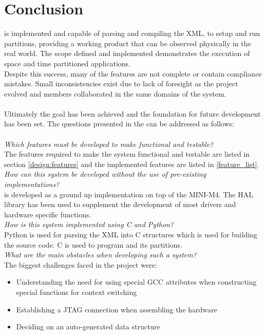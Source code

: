 \chapter{Conclusion}
\OSname{} is implemented and capable of parsing and
compiling the XML, to setup and run partitions, providing
a working product that can be observed physically in the real world.
The scope defined and implemented demonstrates the
execution of space and time partitioned applications.
\\
Despite this success, many of the features are not
complete or contain compliance mistakes.
Small inconsistencies exist due to lack of foresight
as the project evolved and members collaborated
in the same domains of the system.
\\\\
Ultimately the goal has been achieved and the
foundation for future development has been set.
The questions presented in the  can be addressed as follows:
\\\\
\textit{Which features must be developed to make \OSname{} functional and
testable?}\\
The features required to make the system functional and testable are listed in  section \ref{design:features}
and the implemented features are listed in \ref{feature_list}.\\

\textit{How can this system be developed without the use of pre-existing
implementations?}\\
\OSname{} is developed as a ground up implementation on top of the MINI-M4.
The HAL library has been used to supplement the development of most drivers and hardware specific functions.\\

\textit{How is this system implemented using C and Python?}\\
Python is used for parsing the XML into C structures which is used for building the source code.
C is used to program \OSname{} and its partitions.\\

\textit{What are the main obstacles when developing such a system?}\\
The biggest challenges faced in the project were:
\begin{itemize}
	\item Understanding the need for using special GCC attributes when constructing special functions for context switching
	\item Establishing a JTAG connection when assembling the hardware
	\item Deciding on an auto-generated data structure
\end{itemize}

